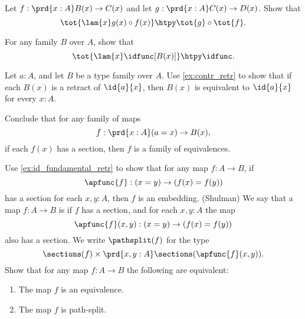 \begin{exercises}
\begin{subexenum}
\begin{equation*}
    \end{equation*}
  \item Let $f:\prd{x:A}B(x)\to C(x)$ and let $g:\prd{x:A}C(x)\to D(x)$. Show that
    \begin{equation*}
      \tot{\lam{x}g(x)\circ f(x)}\htpy \tot{g}\circ\tot{f}.
    \end{equation*}
  \item For any family $B$ over $A$, show that
    \begin{equation*}
      \tot{\lam{x}\idfunc[B(x)]}\htpy\idfunc.
    \end{equation*}
  \item Let $a:A$, and let $B$ be a type family over $A$. Use \cref{ex:contr_retr} to show that if each $B(x)$ is a retract of $\id{a}{x}$, then $B(x)$ is equivalent to $\id{a}{x}$ for every $x:A$.
  \item Conclude that for any family of maps
    \begin{equation*}
      f : \prd{x:A} (a=x) \to B(x),
    \end{equation*}
    if each $f(x)$ has a section, then $f$ is a family of equivalences.
  \end{subexenum} 
  \exitem Use \cref{ex:id_fundamental_retr} to show that for any map $f:A\to B$, if
  \begin{equation*}
    \apfunc{f} : (x=y) \to (f(x)=f(y))
  \end{equation*}
  has a section for each $x,y:A$, then $f$ is an embedding.
  \exitem \label{ex:path-split}(Shulman) We say that a map $f:A\to B$ is  if $f$ has a section, and for each $x,y:A$ the map
  \begin{equation*}
    \apfunc{f}(x,y):(x=y)\to (f(x)=f(y))
  \end{equation*}
  also has a section. We write $\pathsplit(f)$ for the type
  \begin{equation*}
    \sections(f)\times\prd{x,y:A}\sections(\apfunc{f}(x,y)).
  \end{equation*}
  Show that for any map $f:A\to B$ the following are equivalent:
  \begin{enumerate}
  \item The map $f$ is an equivalence.
  \item The map $f$ is path-split.

\end{enumerate}
\end{exercises}
